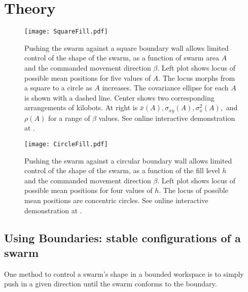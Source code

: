 \section{Theory}
\label{sec:theory}
\begin{figure*}[!htb]
\begin{center}
\texttt{[image: SquareFill.pdf]} 
\vspace{-1em}
\caption{Pushing the swarm against a square boundary wall allows limited control of the shape of the swarm, as a function of swarm area $A$ and the commanded movement direction $\beta$. Left plot shows locus of possible mean positions for five values of $A$.  The locus morphs from a square to a circle as $A$ increases.  The covariance ellipse for each $A$ is shown with a dashed line. Center shows two corresponding arrangements of kilobots.  At right is $\bar{x}(A), \sigma_{xy}(A), \sigma_x^2(A),$ and $\rho(A)$ for a range of $\beta$ values. See online interactive demonstration at \citep{Zhao2016mathematicaSquare}.}
\label{fig:SquareFill}
\end{center}
\end{figure*} 
\begin{figure*}[!htb]
\begin{center}
\vspace{-1em}
\texttt{[image: CircleFill.pdf]} 
\vspace{-1em}
\caption{Pushing the swarm against a circular boundary wall allows limited control of the shape of the swarm, as a function of the fill level $h$ and the commanded movement direction $\beta$. Left plot shows locus of possible mean positions for four values of $h$. The locus of possible mean positions are concentric circles. See online interactive demonstration at \citep{Zhao2016mathematica}.}  
\label{fig:CircleFill}
\end{center}
\end{figure*} 

\subsection{Using Boundaries: stable configurations of a swarm}\label{subsec:FluidInTank}
One method to control a swarm's shape in a bounded workspace is to simply push in a given direction until the swarm conforms to the boundary.

